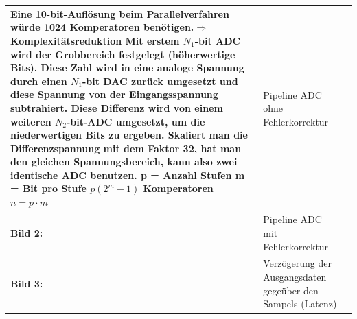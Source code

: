 \begin{longtable}{|>{\bfseries}p{4cm}|p{6cm}|p{8cm}|}
    Eine 10-bit-Auflösung beim Parallelverfahren würde 1024 Komperatoren
    benötigen.$\Rightarrow$Komplexitätsreduktion \newline
    Mit erstem $N_{1}$-bit ADC wird der Grobbereich festgelegt (höherwertige
    Bits). Diese Zahl wird in eine analoge Spannung durch einen $N_{1}$-bit DAC zurück
    umgesetzt und diese Spannung von der Eingangsspannung subtrahiert. Diese
    Differenz wird von einem weiteren $N_{2}$-bit-ADC umgesetzt, um die
    niederwertigen Bits zu ergeben. Skaliert man die Differenzspannung mit dem
    Faktor 32, hat man den gleichen Spannungsbereich, kann also zwei identische
    ADC benutzen. \newline
    p = Anzahl Stufen \newline
    m = Bit pro Stufe \newline
    $p(2^m-1)$ Komperatoren \newline
    $n = p \cdot m$ \newline
    \newline
    \begin{tabular}{lp{6cm}}
      Bild 1: & Pipeline ADC ohne Fehlerkorrektur \\
      Bild 2: & Pipeline ADC mit Fehlerkorrektur \\
      Bild 3: & Verzögerung der Ausgangsdaten gegeüber den Sampels (Latenz)
    \end{tabular} \\
  \hline
\end{longtable}

\newpage

